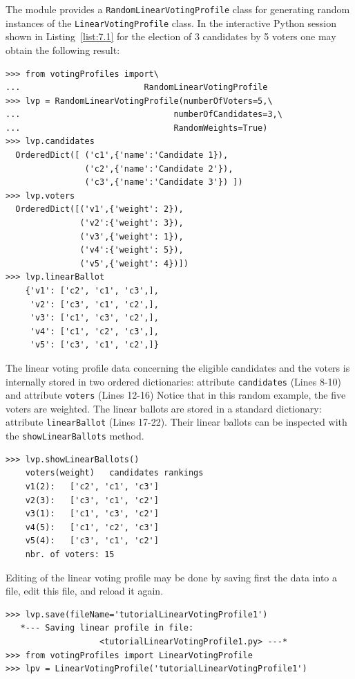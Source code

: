 The module provides a \texttt{RandomLinearVotingProfile} class  for generating random instances of the \texttt{LinearVotingProfile} class. In the interactive Python session shown in Listing~\vref{list:7.1} for the election of 3 candidates by 5 voters one may obtain the following result:
\begin{lstlisting}[caption={Example of random linear voting profile},label=list:7.1]
>>> from votingProfiles import\
...                         RandomLinearVotingProfile
>>> lvp = RandomLinearVotingProfile(numberOfVoters=5,\
...                               numberOfCandidates=3,\
...                               RandomWeights=True) 
>>> lvp.candidates
  OrderedDict([ ('c1',{'name':'Candidate 1}),
                ('c2',{'name':'Candidate 2'}),
                ('c3',{'name':'Candidate 3'}) ])
>>> lvp.voters
  OrderedDict([('v1',{'weight': 2}),
               ('v2':{'weight': 3}), 
               ('v3',{'weight': 1}),
               ('v4':{'weight': 5}),
               ('v5',{'weight': 4})])
>>> lvp.linearBallot
    {'v1': ['c2', 'c1', 'c3',],
     'v2': ['c3', 'c1', 'c2',],
     'v3': ['c1', 'c3', 'c2',],
     'v4': ['c1', 'c2', 'c3',],
     'v5': ['c3', 'c1', 'c2',]} 
 \end{lstlisting}
The linear voting profile data concerning the eligible candidates and the voters is internally stored in two ordered dictionaries: attribute \texttt{candidates} (Lines 8-10) and attribute \texttt{voters} (Lines 12-16) Notice that in this random example, the five voters are weighted. The linear ballots are stored in a standard dictionary: attribute \texttt{linearBallot} (Lines 17-22). Their linear ballots can be inspected with the \texttt{showLinearBallots} method.
\begin{lstlisting}
>>> lvp.showLinearBallots()
    voters(weight)	 candidates rankings
    v1(2): 	 ['c2', 'c1', 'c3']
    v2(3): 	 ['c3', 'c1', 'c2']
    v3(1): 	 ['c1', 'c3', 'c2']
    v4(5): 	 ['c1', 'c2', 'c3']
    v5(4): 	 ['c3', 'c1', 'c2']
    nbr. of voters: 15
\end{lstlisting}

Editing of the linear voting profile may be done by saving first the data into a file, edit this file, and reload it again.
\begin{lstlisting}
>>> lvp.save(fileName='tutorialLinearVotingProfile1')
   *--- Saving linear profile in file:
                   <tutorialLinearVotingProfile1.py> ---*
>>> from votingProfiles import LinearVotingProfile
>>> lpv = LinearVotingProfile('tutorialLinearVotingProfile1')
\end{lstlisting}

